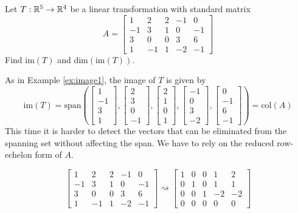 \documentclass{ximera}
\begin{document}
 
 
\begin{example}\label{ex:image2}
Let $T:\mathbb{R}^5\rightarrow \mathbb{R}^4$ be a linear transformation with standard matrix $$A=\begin{bmatrix}1 & 2 & 2 &-1 & 0\\-1 & 3 & 1 & 0 & -1\\3 & 0 & 0 & 3 & 6\\ 1 & -1 & 1 & -2 & -1\end{bmatrix}$$
Find $\mbox{im}(T)$ and $\mbox{dim}(\mbox{im}(T))$.
\begin{explanation}
As in Example \ref{ex:image1}, the image of $T$ is given by
$$\mbox{im}(T)=\mbox{span}\left(\begin{bmatrix}1\\-1\\3\\1\end{bmatrix}, \begin{bmatrix}2\\3\\0\\-1\end{bmatrix}, \begin{bmatrix}2\\1\\0\\1\end{bmatrix}, \begin{bmatrix}-1\\0\\3\\-2\end{bmatrix}, \begin{bmatrix}0\\-1\\6\\-1\end{bmatrix}\right)=\mbox{col}(A)$$
This time it is harder to detect the vectors that can be eliminated from the spanning set without affecting the span.  We have to rely on the reduced row-echelon form of $A$.
 
$$\begin{bmatrix}1 & 2 & 2 &-1 & 0\\-1 & 3 & 1 & 0 & -1\\3 & 0 & 0 & 3 & 6\\ 1 & -1 & 1 & -2 & -1\end{bmatrix}  \rightsquigarrow \begin{bmatrix} 1 & 0 & 0 & 1 & 2\\0 & 1 & 0 & 1 & 1\\0 & 0 & 1 & -2 & -2\\ 0 & 0 & 0 & 0 & 0 \end{bmatrix}$$
 

\end{explanation}
\end{example}
\end{document}
